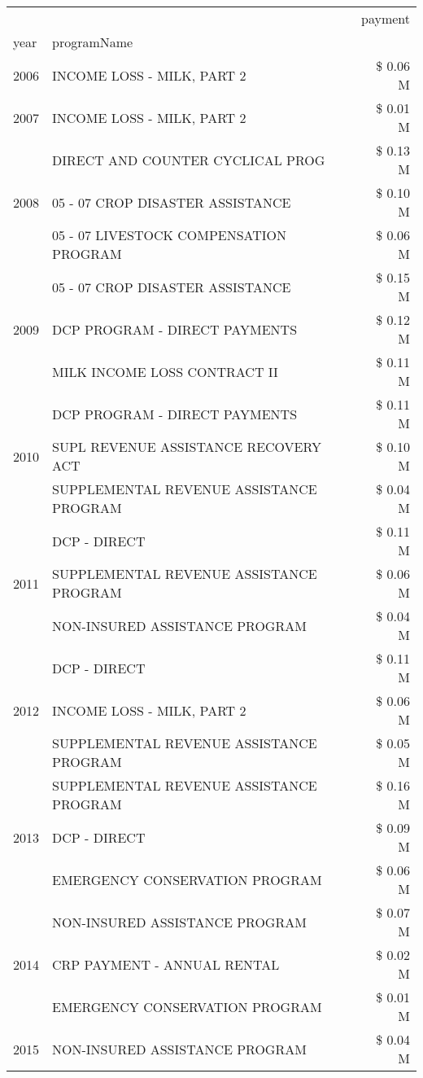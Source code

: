 \begin{tabular}{llr}
\toprule
 &  & payment \\
year & programName &  \\
\midrule
2006 & INCOME LOSS - MILK, PART 2 & \$ 0.06 M \\
\cline{1-3}
2007 & INCOME LOSS - MILK, PART 2 & \$ 0.01 M \\
\cline{1-3}
\multirow[t]{3}{*}{2008} & DIRECT AND COUNTER CYCLICAL PROG & \$ 0.13 M \\
 & 05 - 07 CROP DISASTER ASSISTANCE & \$ 0.10 M \\
 & 05 - 07 LIVESTOCK COMPENSATION PROGRAM & \$ 0.06 M \\
\cline{1-3}
\multirow[t]{3}{*}{2009} & 05 - 07 CROP DISASTER ASSISTANCE & \$ 0.15 M \\
 & DCP PROGRAM - DIRECT PAYMENTS & \$ 0.12 M \\
 & MILK INCOME LOSS CONTRACT II & \$ 0.11 M \\
\cline{1-3}
\multirow[t]{3}{*}{2010} & DCP PROGRAM - DIRECT PAYMENTS & \$ 0.11 M \\
 & SUPL REVENUE ASSISTANCE RECOVERY ACT & \$ 0.10 M \\
 & SUPPLEMENTAL REVENUE ASSISTANCE PROGRAM & \$ 0.04 M \\
\cline{1-3}
\multirow[t]{3}{*}{2011} & DCP - DIRECT & \$ 0.11 M \\
 & SUPPLEMENTAL REVENUE ASSISTANCE PROGRAM & \$ 0.06 M \\
 & NON-INSURED ASSISTANCE PROGRAM & \$ 0.04 M \\
\cline{1-3}
\multirow[t]{3}{*}{2012} & DCP - DIRECT & \$ 0.11 M \\
 & INCOME LOSS - MILK, PART 2 & \$ 0.06 M \\
 & SUPPLEMENTAL REVENUE ASSISTANCE PROGRAM & \$ 0.05 M \\
\cline{1-3}
\multirow[t]{3}{*}{2013} & SUPPLEMENTAL REVENUE ASSISTANCE PROGRAM & \$ 0.16 M \\
 & DCP - DIRECT & \$ 0.09 M \\
 & EMERGENCY CONSERVATION PROGRAM & \$ 0.06 M \\
\cline{1-3}
\multirow[t]{3}{*}{2014} & NON-INSURED ASSISTANCE PROGRAM & \$ 0.07 M \\
 & CRP PAYMENT - ANNUAL RENTAL & \$ 0.02 M \\
 & EMERGENCY CONSERVATION PROGRAM & \$ 0.01 M \\
\cline{1-3}
\multirow[t]{3}{*}{2015} & NON-INSURED ASSISTANCE PROGRAM & \$ 0.04 M \\

\end{tabular}

